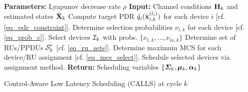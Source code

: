 
{\linespread{1.3}
\begin{algorithm}[t] \begin{algorithmic}[1]
\STATE \textbf{Parameters:} Lyapunov decrease rate $\rho$
\STATE \textbf{Input:} Channel conditions ${\mathbf H}_k$ and estimated states ${\hat{\mathbf X} }_{k}$
\STATE Compute target PDR ${\tilde q}_i({\hat{\mathbf x} }^{(l_i)}_{i,k})$ for each device $i$ [cf. \eqref{eq_pdr_constraint}].
\STATE Determine selection probabilities $\nu_{i,k}$ for each device [cf. \eqref{eq_prob_c}].
\STATE Select devices ${\mathcal I}_k$ with probs. $\{\nu_{1,k},\hdots,\nu_{m,k}\}$
\STATE Determine set of RUs/PPDUs ${\mathcal S}'_k$ [cf. \eqref{eq_ru_sets}].
\STATE Determine maximum MCS for each device/RU assignment [cf. \eqref{eq_mcs_select}].
\STATE Schedule selected devices via assignment method.
\STATE \textbf{Return:} Scheduling variables $\{\boldsymbol{\Sigma}_k, \boldsymbol{\mu}_k, \boldsymbol{\alpha}_k\}$ 
\end{algorithmic}
\caption{Control-Aware Low Latency Scheduling (CALLS) at cycle $k$}\label{alg_calls} \end{algorithm}}

